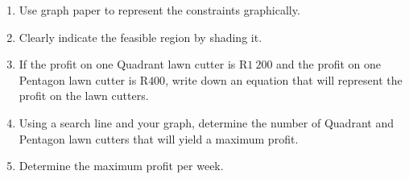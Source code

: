 \begin{wex}
{\begin{enumerate}
{%
ts in terms of $x$ and $y$ to represent the above mentioned
information.}
\item{Use graph paper to represent the constraints graphically.}
\item{Clearly indicate the feasible region by shading it.}
\item{If the profit on one Quadrant lawn cutter is R$1~200$ and the profit on one Pentagon
lawn cutter is R$400$, write down an equation that will represent the profit on the
lawn cutters.}
\item{Using a search line and your graph, determine the number of Quadrant and
Pentagon lawn cutters that will yield a maximum profit.}
\item{Determine the maximum profit per week.}
\end{enumerate}
}{

}
\end{wex}

